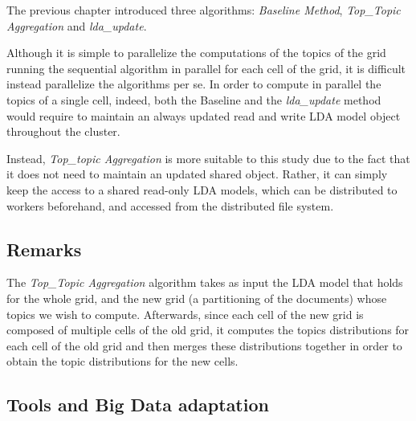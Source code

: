 The previous chapter introduced three algorithms: \emph{Baseline Method}, \emph{Top\_Topic Aggregation} and \emph{lda\_update}. 

Although it is simple to parallelize the computations of the topics of the grid running the sequential algorithm in parallel for each cell of the grid, it is difficult instead parallelize the algorithms per se. In order to compute in parallel the topics of a single cell, indeed, both the Baseline and the \emph{lda\_update} method would require to maintain an always updated read and write LDA model object throughout the cluster.

Instead, \emph{Top\_topic Aggregation} is more suitable to this study due to the fact that it does not need to maintain an updated shared object. Rather, it can simply keep the access to a shared read-only LDA models, which can be distributed to workers beforehand, and accessed from the distributed file system. 


\subsection{Remarks}

The \emph{Top\_Topic Aggregation} algorithm takes as input the LDA model that holds for the whole grid, and the new grid (a partitioning of the documents) whose topics we wish to compute. Afterwards, since each cell of the new grid is composed of multiple cells of the old grid, it computes the topics distributions for each cell of the old grid and then merges these distributions together in order to obtain the topic distributions for the new cells. 

\subsection{Tools and Big Data adaptation}


